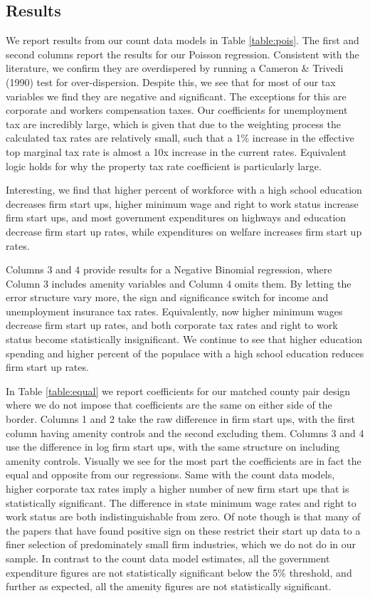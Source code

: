 \subsection{Results}

We report results from our count data models in Table \ref{table:pois}. The first and second columns report the results for our Poisson regression. Consistent with the literature, we confirm they are overdispered by running a Cameron \& Trivedi (1990) test for over-dispersion. Despite this, we see that for most of our tax variables we find they are negative and significant. The exceptions for this are corporate and workers compensation taxes. Our coefficients for unemployment tax are incredibly large, which is given that due to the weighting process the calculated tax rates are relatively small, such that a 1\% increase in the effective top marginal tax rate is almost a 10x increase in the current rates. Equivalent logic holds for why the property tax rate coefficient is particularly large.

Interesting, we find that higher percent of workforce with a high school education decreases firm start ups, higher minimum wage and right to work status increase firm start ups, and most government expenditures on highways and education decrease firm start up rates, while expenditures on welfare increases firm start up rates.

Columns 3 and 4 provide results for a Negative Binomial regression, where Column 3 includes amenity variables and Column 4 omits them. By letting the error structure vary more, the sign and significance switch for income and unemployment insurance tax rates. Equivalently, now higher minimum wages decrease firm start up rates, and both corporate tax rates and right to work status become statistically insignificant. We continue to see that higher education spending and higher percent of the populace with a high school education reduces firm start up rates.

In Table \ref{table:equal} we report coefficients for our matched county pair design where we do not impose that coefficients are the same on either side of the border. Columns 1 and 2 take the raw difference in firm start ups, with the first column having amenity controls and the second excluding them. Columns 3 and 4 use the difference in log firm start ups, with the same structure on including amenity controls. Visually we see for the most part the coefficients are in fact the equal and opposite from our regressions. Same with the count data models, higher corporate tax rates imply a higher number of new firm start ups that is statistically significant. The difference in state minimum wage rates and right to work status are both indistinguishable from zero. Of note though is that many of the papers that have found positive sign on these restrict their start up data to a finer selection of predominately small firm industries, which we do not do in our sample. In contrast to the count data model estimates, all the government expenditure figures are not statistically significant below the 5\% threshold, and further as expected, all the amenity figures are not statistically significant.

